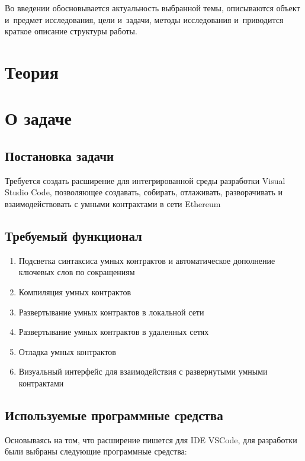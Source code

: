 \documentclass[a4paper,12pt]{diplom}
\begin{document}

Во введении обосновывается актуальность выбранной темы,
описываются объект и~предмет исследования, цели и~задачи, методы исследования и~приводится краткое описание структуры работы.

\chapter{Теория}

\chapter{О задаче}

\section{Постановка задачи}

Требуется создать расширение для интегрированной среды разработки Visual Studio Code, позволяющее создавать,
собирать, отлаживать, разворачивать и взаимодействовать с умными контрактами в сети Ethereum

\section{Требуемый функционал}

\begin{enumerate}
  \item Подсветка синтаксиса умных контрактов и автоматическое дополнение ключевых слов по сокращениям
  \item Компиляция умных контрактов
  \item Развертывание умных контрактов в локальной сети
  \item Развертывание умных контрактов в удаленных сетях
  \item Отладка умных контрактов
  \item Визуальный интерфейс для взаимодействия с развернутыми умными контрактами
\end{enumerate}

\section{Используемые программные средства}

Основываясь на том, что расширение пишется для IDE VSCode, для разработки были выбраны следующие программные средства:
\end{document}
